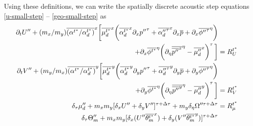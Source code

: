 Using these definitions, we can write the spatially discrete 
acoustic step equations \hfill\break
\eqref{u-small-step} -- \eqref{geo-small-step} as
%
\begin{align}
\partial_t U'' + (m_x/m_y)\overline{(\alpha^{t^*}/\alpha^{t^*}_d)}^x \bigg[\overline{\mu_d^{t^*}}^x\bigg(
\overline{\alpha_d^{t^*}}^x  \partial_x {p''}^\tau  + \overline{{\alpha_d''}^\tau}^x  \partial_x {\overline p}
+ \partial_x \overline{{\phi''}^\tau}^\eta \bigg)
\notag &
\\
+ \partial_x \overline{\phi^{t^*}}^\eta \bigg(\partial_\eta \overline{\overline{{p''}}^x}^\eta - \overline{{\mu''_d}}^x \bigg)^\tau \,\bigg]  & = R_U^{t^*}
\label{u-discrete}
\\
%
\partial_t V'' + (m_y/m_x)\overline{(\alpha^{t^*}/\alpha^{t^*}_d)}^y \bigg[\overline{\mu_d^{t^*}}^y\bigg(
\overline{\alpha_d^{t^*}}^y  \partial_y  {p''}^\tau  + \overline{{\alpha_d''}^\tau}^y  \partial_y {\overline p}
+ \partial_y \overline{{\phi''}^\tau}^\eta \bigg) 
 \notag &
\\
+ \partial_y \overline{\phi^{t^*}}^\eta \bigg(\partial_\eta \overline{\overline{{p''}}^y}^\eta - \overline{{\mu''_d}}^y \bigg)^\tau \, \bigg]  & = R_V^{t^*}
\label{v-discrete}
\\
 \delta_\tau \mu_d'' 
 + m_x m_y[\delta_x U'' + \delta_y V'']^{\tau+\Delta \tau} 
+ m_y {\delta_\eta \Omega''^{\tau+\Delta \tau}} & = 
R_\mu^{t^*}
\label{mu-discrete}
\\
 \delta_\tau \Theta_m'' 
+ m_x m_y[  \delta_x (U''\overline{\theta_m^{t^*}}^x)
      + \delta_y (V''\overline{\theta_m^{t^*}}^y)]^{\tau+\Delta \tau} 

\end{align}
